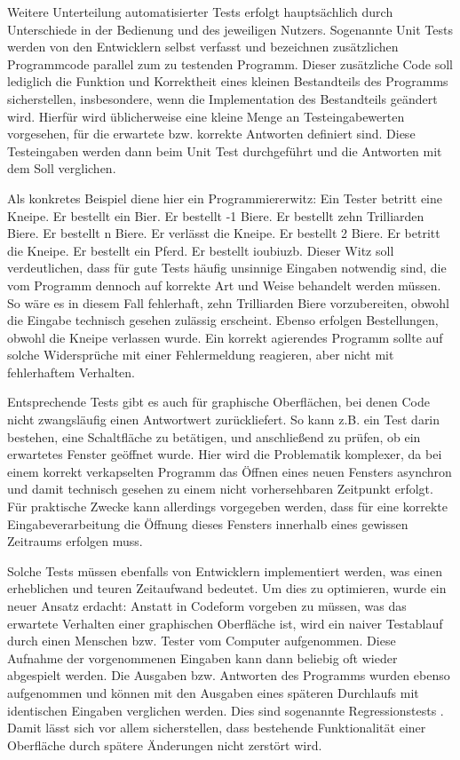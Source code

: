Weitere Unterteilung automatisierter Tests erfolgt hauptsächlich durch Unterschiede
in der Bedienung und des jeweiligen Nutzers. Sogenannte \glqq{}Unit Tests\grqq{} werden
von den Entwicklern selbst verfasst und bezeichnen zusätzlichen Programmcode parallel
zum zu testenden Programm. Dieser zusätzliche Code soll lediglich die Funktion und Korrektheit
eines kleinen Bestandteils des Programms sicherstellen, insbesondere, wenn die Implementation
des Bestandteils geändert wird. Hierfür wird üblicherweise eine kleine Menge an Testeingabewerten
vorgesehen, für die erwartete bzw. korrekte Antworten definiert sind. Diese Testeingaben
werden dann beim Unit Test durchgeführt und die Antworten mit dem Soll verglichen.

Als konkretes Beispiel diene hier ein Programmiererwitz: Ein Tester betritt eine Kneipe.
Er bestellt ein Bier. Er bestellt -1 Biere. Er bestellt zehn Trilliarden Biere. Er bestellt n Biere.
Er verlässt die Kneipe. Er bestellt 2 Biere. Er betritt die Kneipe. Er bestellt ein Pferd. Er bestellt \glqq{}ioubiuzb\grqq{}.
Dieser Witz soll verdeutlichen, dass für gute Tests häufig unsinnige Eingaben notwendig sind,
die vom Programm dennoch auf korrekte Art und Weise behandelt werden müssen. So wäre es in diesem
Fall fehlerhaft, zehn Trilliarden Biere vorzubereiten, obwohl die Eingabe technisch gesehen zulässig erscheint.
Ebenso erfolgen Bestellungen, obwohl die Kneipe verlassen wurde. Ein korrekt agierendes
Programm sollte auf solche Widersprüche mit einer Fehlermeldung reagieren, aber nicht mit
fehlerhaftem Verhalten.

Entsprechende Tests gibt es auch für graphische Oberflächen, bei denen Code nicht zwangsläufig
einen Antwortwert zurückliefert. So kann z.B. ein Test darin bestehen, eine Schaltfläche zu betätigen,
und anschließend zu prüfen, ob ein erwartetes Fenster geöffnet wurde. Hier wird die Problematik
komplexer, da bei einem korrekt verkapselten Programm das Öffnen eines neuen Fensters asynchron
und damit technisch gesehen zu einem nicht vorhersehbaren Zeitpunkt erfolgt. Für praktische Zwecke
kann allerdings vorgegeben werden, dass für eine korrekte Eingabeverarbeitung die Öffnung dieses 
Fensters innerhalb eines gewissen Zeitraums erfolgen muss.

Solche Tests müssen ebenfalls von Entwicklern implementiert werden, was einen erheblichen und
teuren Zeitaufwand bedeutet. Um dies zu optimieren, wurde ein neuer Ansatz erdacht: Anstatt
in Codeform vorgeben zu müssen, was das erwartete Verhalten einer graphischen Oberfläche ist,
wird ein naiver Testablauf durch einen Menschen bzw. Tester vom Computer aufgenommen. Diese Aufnahme der
vorgenommenen Eingaben kann dann beliebig oft wieder abgespielt werden. Die Ausgaben bzw.
Antworten des Programms wurden ebenso aufgenommen und können mit den Ausgaben eines späteren
Durchlaufs mit identischen Eingaben verglichen werden. Dies sind sogenannte 
\glqq{}Regressionstests\grqq{} \cite{regression}. Damit lässt sich vor allem sicherstellen,
dass bestehende Funktionalität einer Oberfläche durch spätere Änderungen nicht zerstört wird.

